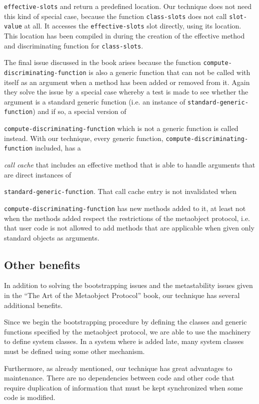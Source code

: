 \texttt{effective-slots} and return a predefined
location.  Our technique does not need this kind of special case,
because the function \texttt{class-slots} does not call
\texttt{slot-value} at all.  It accesses the \texttt{effective-slots}
slot directly, using its location.  This location has been compiled in
during the creation of the effective method and discriminating
function for \texttt{class-slots}.

The final issue discussed in the book arises because the function
\texttt{compute-discriminating-function} is also a generic function
that can not be called with itself as an argument when a method has
been added or removed from it.  Again they solve the issue by a
special case whereby a test is made to see whether the argument is a
standard generic function (i.e. an instance of
\texttt{standard-generic-function}) and if so, a special version of

\texttt{compute-discriminating-function} which is not a generic
function is called instead.  With our technique, every generic
function, \texttt{compute-discriminating-function} included, has a 

\emph{call cache} that includes an effective method that is able to
handle arguments that are direct instances of

\texttt{standard-generic-function}.  That call cache entry is not
invalidated when

\texttt{compute-discriminating-function} has new
methods added to it, at least not when the
methods added respect the restrictions of the metaobject protocol,
i.e. that user code is not allowed to add methods that are applicable
when given only standard objects as arguments.

\subsection{Other benefits}

In addition to solving the bootstrapping issues and the metastability
issues given in the ``The Art of the Metaobject Protocol'' book, our
technique has several additional benefits.

Since we begin the bootstrapping procedure by
defining the classes and generic functions specified by the metaobject
protocol, we are able to use the \clos{} machinery to define system
classes.  In a system where \clos{} is added late, many system classes
must be defined using some other mechanism.

Furthermore, as already mentioned, our technique has great advantages
to maintenance.  There are no dependencies between \clos{} code and
other code that require duplication of information that must be kept
synchronized when some code is modified.
